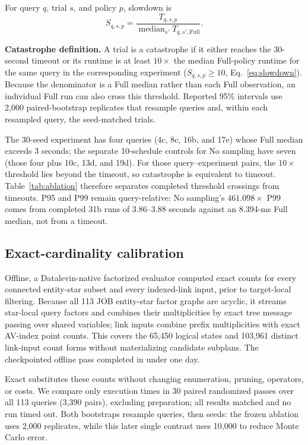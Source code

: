 \documentclass[sigconf]{cidr-2027}
\begin{document}
For query $q$, trial $s$, and policy $p$, slowdown is
\begin{equation}
  S_{q,s,p} =
  \frac{T_{q,s,p}}
       {\operatorname{median}_{s'}T_{q,s',\mathrm{Full}}}.
  \label{eq:slowdown}
\end{equation}

\textbf{Catastrophe definition.} A trial is a catastrophe if it either reaches
the 30-second timeout or its runtime is at least $10\times$ the median
Full-policy runtime for the same query in the corresponding experiment
($S_{q,s,p}\geq 10$, Eq.~\ref{eq:slowdown}). Because the denominator is a Full median rather than
each Full observation, an individual Full run can also cross this threshold.
Reported 95\% intervals use 2,000 paired-bootstrap replicates that resample
queries and, within each resampled query, the seed-matched trials.

The 30-seed experiment has four queries (4c, 8c, 16b, and 17e) whose Full
median exceeds 3 seconds; the separate 10-schedule controls for No sampling
have seven (those four plus 10c, 13d, and 19d). For those query--experiment
pairs, the $10\times$ threshold lies beyond the timeout, so catastrophe is
equivalent to timeout. Table~\ref{tab:ablation} therefore separates completed
threshold crossings from timeouts. P95 and P99 remain query-relative: No
sampling's $461.098\times$ P99 comes from completed 31b runs of 3.86--3.88
seconds against an 8.394-ms Full median, not from a timeout.

\subsection{Exact-cardinality calibration}
\label{sec:exact}

Offline, a Datalevin-native factorized evaluator computed exact counts for
every connected entity-star subset and every indexed-link input, prior to
target-local filtering. Because all 113 JOB entity-star factor graphs are
acyclic, it streams star-local query factors and combines their multiplicities
by exact tree message passing over shared variables; link inputs combine
prefix multiplicities with exact AV-index point counts. This covers the
65,450 logical states and 103,961 distinct link-input count forms without
materializing candidate subplans. The checkpointed offline pass completed in
under one day.

Exact substitutes these counts without changing enumeration, pruning,
operators, or costs. We compare only execution times in 30 paired randomized
passes over all 113 queries (3,390 pairs), excluding preparation; all results
matched and no run timed out. Both bootstraps resample queries, then seeds:
the frozen ablation uses 2,000 replicates, while this later single contrast
uses 10,000 to reduce Monte Carlo error.
\end{document}
